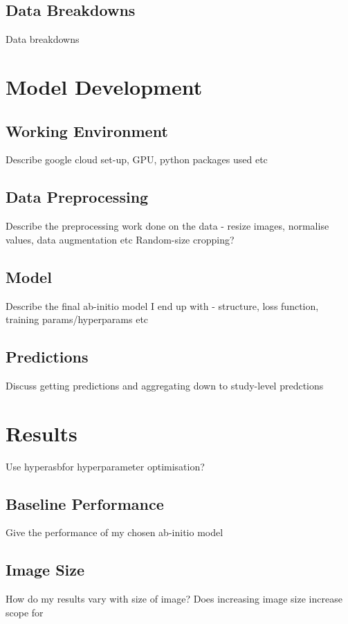 \documentclass[11pt]{article} %
\theoremstyle{plain}
\theoremstyle{definition}
\begin{document}
\newpage
\subsection{Data Breakdowns}
Data breakdowns



\newpage
\section{Model Development}

\subsection{Working Environment}
Describe google cloud set-up, GPU, python packages used etc

\subsection{Data Preprocessing}
Describe the preprocessing work done on the data - resize images, normalise values, data augmentation etc 
Random-size cropping?

\subsection{Model}
Describe the final ab-initio model I end up with - structure, loss function, training params/hyperparams etc

\subsection{Predictions}
Discuss getting predictions and aggregating down to study-level predctions



\newpage
\section{Results}
Use hyperasbfor hyperparameter optimisation? 
\subsection{Baseline Performance}
Give the performance of my chosen ab-initio model

\subsection{Image Size}
How do my results vary with size of image? Does increasing image size increase scope for
\end{document}
